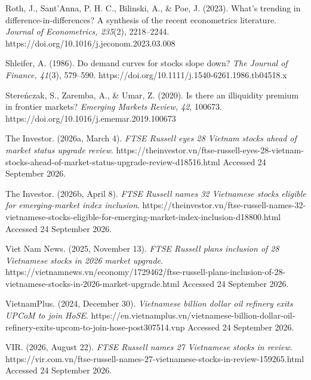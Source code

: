 Roth, J., Sant'Anna, P. H. C., Bilinski, A., \& Poe, J. (2023). What's
trending in difference-in-differences? A synthesis of the recent
econometrics literature. \emph{Journal of Econometrics, 235}(2),
2218--2244. https://doi.org/10.1016/j.jeconom.2023.03.008

Shleifer, A. (1986). Do demand curves for stocks slope down? \emph{The
Journal of Finance, 41}(3), 579--590.
https://doi.org/10.1111/j.1540-6261.1986.tb04518.x

Stereńczak, S., Zaremba, A., \& Umar, Z. (2020). Is there an illiquidity
premium in frontier markets? \emph{Emerging Markets Review, 42}, 100673.
https://doi.org/10.1016/j.ememar.2019.100673

The Investor. (2026a, March 4). \emph{FTSE Russell eyes 28 Vietnam
stocks ahead of market status upgrade review}.
https://theinvestor.vn/ftse-russell-eyes-28-vietnam-stocks-ahead-of-market-status-upgrade-review-d18516.html
Accessed 24 September 2026.

The Investor. (2026b, April 8). \emph{FTSE Russell names 32 Vietnamese
stocks eligible for emerging-market index inclusion}.
https://theinvestor.vn/ftse-russell-names-32-vietnamese-stocks-eligible-for-emerging-market-index-inclusion-d18800.html
Accessed 24 September 2026.

Viet Nam News. (2025, November 13). \emph{FTSE Russell plans inclusion
of 28 Vietnamese stocks in 2026 market upgrade}.
https://vietnamnews.vn/economy/1729462/ftse-russell-plans-inclusion-of-28-vietnamese-stocks-in-2026-market-upgrade.html
Accessed 24 September 2026.

VietnamPlus. (2024, December 30). \emph{Vietnamese billion dollar oil
refinery exits UPCoM to join HoSE}.
https://en.vietnamplus.vn/vietnamese-billion-dollar-oil-refinery-exits-upcom-to-join-hose-post307514.vnp
Accessed 24 September 2026.

VIR. (2026, August 22). \emph{FTSE Russell names 27 Vietnamese stocks in
review}.
https://vir.com.vn/ftse-russell-names-27-vietnamese-stocks-in-review-159265.html
Accessed 24 September 2026.
